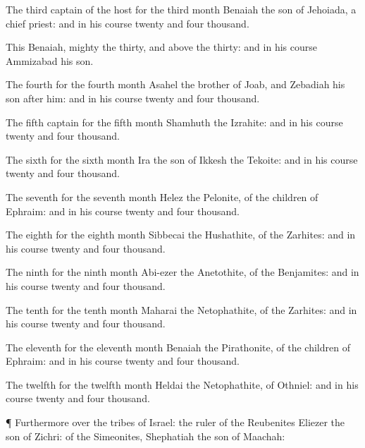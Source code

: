 {The
third
captain of the
host for the
third
month
{}
Benaiah the
son of
Jehoiada, a
chief
priest: and in his
course
{}
twenty and
four
thousand.

This
{}
Benaiah,
{}
mighty
{} the
thirty, and above the
thirty: and in his
course
{}
Ammizabad his
son.

The
fourth
{} for the
fourth
month
{}
Asahel the
brother of
Joab, and
Zebadiah his
son
after him: and in his
course
{}
twenty and
four
thousand.

The
fifth
captain for the
fifth
month
{}
Shamhuth the
Izrahite: and in his
course
{}
twenty and
four
thousand.

The
sixth
{} for the
sixth
month
{}
Ira the
son of
Ikkesh the
Tekoite: and in his
course
{}
twenty and
four
thousand.

The
seventh
{} for the
seventh
month
{}
Helez the
Pelonite, of the
children of
Ephraim: and in his
course
{}
twenty and
four
thousand.

The
eighth
{} for the
eighth
month
{}
Sibbecai the
Hushathite, of the
Zarhites: and in his
course
{}
twenty and
four
thousand.

The
ninth
{} for the
ninth
month
{}
Abi-ezer the
Anetothite, of the
Benjamites: and in his
course
{}
twenty and
four
thousand.

The
tenth
{} for the
tenth
month
{}
Maharai the
Netophathite, of the
Zarhites: and in his
course
{}
twenty and
four
thousand.

The
eleventh
{} for the
eleventh
month
{}
Benaiah the
Pirathonite, of the
children of
Ephraim: and in his
course
{}
twenty and
four
thousand.

The
twelfth
{} for the
twelfth
month
{}
Heldai the
Netophathite, of
Othniel: and in his
course
{}
twenty and
four
thousand.


\par }{\PP {}¶ Furthermore over the
tribes of
Israel: the
ruler of the
Reubenites
{}
Eliezer the
son of
Zichri: of the
Simeonites,
Shephatiah the
son of
Maachah:

}
